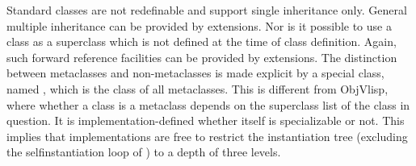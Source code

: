 %
\begin{optDefinition}
\noindent
Standard classes are not redefinable and support single inheritance only.
General multiple inheritance can be provided by extensions.  Nor is it possible
to use a class as a superclass which is not defined at the time of class
definition.  Again, such forward reference facilities can be provided by
extensions. The distinction between metaclasses and non-metaclasses is made
explicit by a special class, named , which is the class of
all metaclasses. This is different from ObjVlisp, where whether a class is a
metaclass depends on the superclass list of the class in question.  It is
implementation-defined whether  itself is specializable or
not. This implies that implementations are free to restrict the instantiation
tree (excluding the selfinstantiation loop of ) to a depth
of three levels.


\end{optDefinition}
